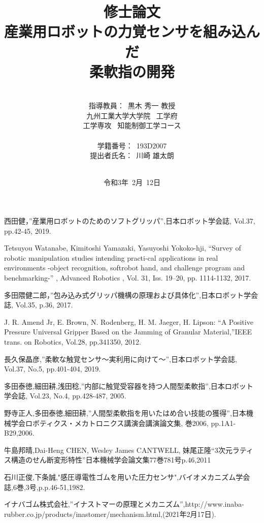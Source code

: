 \documentclass[a4paper,12pt]{jarticle}
\title{修士論文\\
産業用ロボットの力覚センサを組み込んだ\\柔軟指の開発\\
}
\author{\vspace{90mm}\\
指導教員：\ 黒木 \hspace{0mm} 秀一 教授\\
九州工業大学大学院\ \hspace{0mm} 工学府\\
工学専攻\ \hspace{0mm} 知能制御工学コース \\
\vspace{0mm}\\
学籍番号：\ 193D2007\\
提出者氏名：\ 川崎 \hspace{0mm} 雄太朗\\\vspace{5mm}\\ }
\date{令和3年\ 2月\ 12日}
\begin{document}
\titlepage
\maketitle
\thispagestyle{empty}
\newpage
\addtocounter{page}{-1}

\thispagestyle{empty}

\newpage
\thispagestyle{empty}
\addtocounter{page}{-2}
\tableofcontents


\newpage

\newpage

\newpage

\newpage





\begin{thebibliography}{99}

 西田健，”産業用ロボットのためのソフトグリッパ”,日本ロボット学会誌, Vol.37, pp.42-45, 2019.


 Tetsuyou Watanabe, Kimitoshi Yamazaki, Yasuyoshi Yokoko-hji, “Survey of robotic manipulation studies intending practi-cal applications in real environments -object recognition, softrobot hand, and challenge program and benchmarking-” , Advanced Robotics , Vol. 31, Iss. 19–20, pp. 1114-1132, 2017.

 多田隈健二郎，”包み込み式グリッパ機構の原理および具体化”,日本ロボット学会誌, Vol.35, p.36, 2017.

J. R. Amend Jr, E. Brown, N. Rodenberg, H. M. Jaeger, H. Lipson: “A Positive Pressure Universal Gripper Based on the Jamming of Granular Material,”IEEE trans. on Robotics, Vol.28, pp.341350, 2012.

 長久保晶彦,”柔軟な触覚センサ〜実利用に向けて〜”,日本ロボット学会誌, Vol.37, No.5, pp.401-404, 2019.


 多田泰徳,細田耕,浅田稔,”内部に触覚受容器を持つ人間型柔軟指”,日本ロボット学会誌, Vol.23, No.4, pp.428-487, 2005.

 野寺正人,多田泰徳,細田耕,”人間型柔軟指を用いたはめ合い技能の獲得”,日本機械学会ロボティクス・メカトロニクス講演会講演論文集, 巻2006, pp.1A1-B29,2006.

牛島邦晴,Dai-Heng CHEN, Wesley James CANTWELL, 妹尾正隆“3次元ラティス構造のせん断変形特性”日本機械学会論文集77巻781号p.46,2011

 石川正俊,下条誠,"感圧導電性ゴムを用いた圧力センサ",バイオメカニズム学会誌,6巻,3号,p.p.46-51,1982.

 イナバゴム株式会社,”イナストマーの原理とメカニズム”,http://www.inaba-rubber.co.jp/products/inastomer/mechanism.html,(2021年2月17日).



\end{thebibliography}
\end{document}
